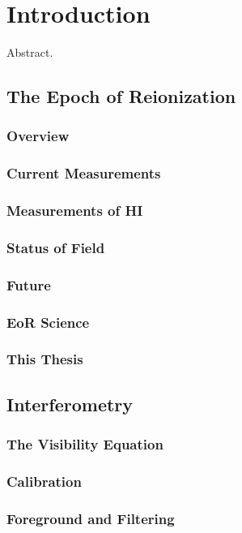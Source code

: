 \chapter{Introduction}
\label{c.intro}

Abstract.

\section{The Epoch of Reionization}
\subsection{Overview}
\subsection{Current Measurements}
\subsection{Measurements of HI}
\subsection{Status of Field}
\subsection{Future}
\subsection{EoR Science}
\subsection{This Thesis}

\section{Interferometry}
\subsection{The Visibility Equation}
\subsection{Calibration}
\subsection{Foreground and Filtering}
